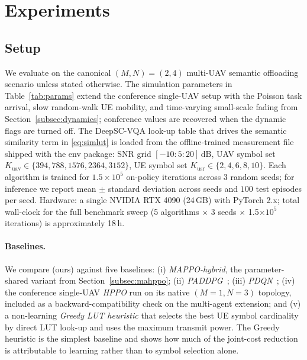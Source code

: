 \section{Experiments}\label{sec:exp}

\subsection{Setup}\label{sec:exp:setup}
We evaluate \method on the canonical $(M,N)=(2,4)$ multi-UAV semantic
offloading scenario unless stated otherwise. The simulation parameters
in Table~\ref{tab:params} extend the conference single-UAV setup with
the Poisson task arrival, slow random-walk UE mobility, and time-varying
small-scale fading from Section~\ref{subsec:dynamics}; conference values
are recovered when the dynamic flags are turned off. The DeepSC-VQA
look-up table that drives the semantic similarity term in
\eqref{eq:simlut} is loaded from the offline-trained measurement file
shipped with the env package: SNR grid
$[-10\!:\!5\!:\!20]\,\mathrm{dB}$, UAV symbol set
$K_{\mathrm{uav}}\in\{394,788,1576,2364,3152\}$, UE symbol set
$K_{\mathrm{usr}}\in\{2,4,6,8,10\}$. Each algorithm is trained for
$1.5\!\times\!10^{5}$ on-policy iterations across $3$ random seeds; for
inference we report mean $\pm$ standard deviation across seeds and
$100$ test episodes per seed. Hardware: a single NVIDIA RTX 4090
(24\,GB) with PyTorch 2.x; total wall-clock for the full benchmark
sweep (5 algorithms $\times$ 3 seeds $\times$ 1.5\!$\times$\!$10^{5}$
iterations) is approximately 18\,h.

\paragraph{Baselines.} We compare \method (ours) against five baselines:
(i) \emph{MAPPO-hybrid}, the parameter-shared variant from
Section~\ref{subsec:mahppo}; (ii) \emph{PADDPG}~\cite{hausknecht2016paddpg};
(iii) \emph{PDQN}~\cite{xiong2018pdqn}; (iv) the conference single-UAV
\emph{HPPO} run on its native $(M=1,N=3)$ topology, included as a
backward-compatibility check on the multi-agent extension; and (v) a
non-learning \emph{Greedy LUT heuristic} that selects the best UE
symbol cardinality by direct LUT look-up and uses the maximum transmit
power. The Greedy heuristic is the simplest baseline and shows how
much of the joint-cost reduction is attributable to learning rather
than to symbol selection alone.


